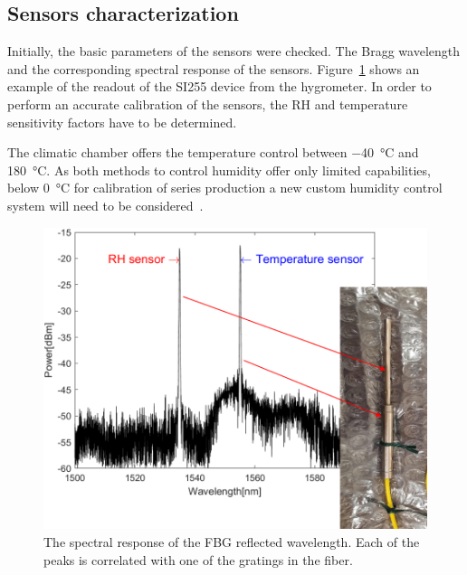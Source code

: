 \subsection{Sensors characterization}

Initially, the basic parameters of the sensors were checked. The Bragg wavelength and the corresponding spectral response of the sensors. 
Figure~\ref{fig_hygrometer1} shows an example of the readout of the SI255 device from the hygrometer. In order to perform an accurate calibration of the sensors, the \gls{RH} and temperature sensitivity factors have to be determined.

The climatic chamber offers the temperature control between \SI{-40}{\celsius} and \SI{180}{\celsius}. As both methods to control humidity offer only limited capabilities, below \SI{0}{\celsius} for calibration of series production a new custom humidity control system will need to be considered~\cite{Berruti, Veldscholte:2021wjt}.
\begin{figure}[!h]
\centering
\includegraphics[width=0.6\columnwidth]{Chapter5/images/hygr.png}
\caption{The spectral response of the FBG reflected wavelength. Each of the peaks is correlated with one of the gratings in the fiber.}
\label{fig_hygrometer1}
\end{figure}


